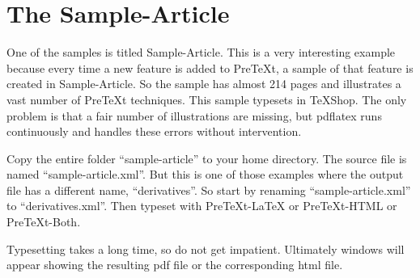 \documentclass[11pt, oneside]{article}   	%
\begin{document}
%
%

\section{The Sample-Article}

One of the samples is titled Sample-Article. This is a very interesting example because every time a new feature is added to PreTeXt, a sample of that feature is created in Sample-Article. So the sample has almost 214 pages and illustrates a vast number of PreTeXt techniques. This sample  typesets in TeXShop. The only problem is that a fair number of illustrations are missing, but pdflatex runs continuously and handles these errors without intervention. 

Copy the entire folder ``sample-article'' to your home directory. The source file is named ``sample-article.xml''. But this is one of those examples where the output file has a different name, ``derivatives''. So start by renaming ``sample-article.xml'' to ``derivatives.xml''.
Then typeset with PreTeXt-LaTeX or PreTeXt-HTML or PreTeXt-Both. 

Typesetting takes a long time, so do not get impatient. Ultimately  windows will appear showing the resulting pdf file or the corresponding html file.
\end{document}

